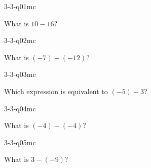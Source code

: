 

\begin{practiceQuestion}{3-3-q01}{mc}
\begin{questionText}
What is $10 - 16$?
\end{questionText}
\end{practiceQuestion}

\begin{practiceQuestion}{3-3-q02}{mc}
\begin{questionText}
What is $(-7) - (-12)$?
\end{questionText}
\end{practiceQuestion}

\begin{practiceQuestion}{3-3-q03}{mc}
\begin{questionText}
Which expression is equivalent to $(-5) - 3$?
\end{questionText}
\end{practiceQuestion}

\begin{practiceQuestion}{3-3-q04}{mc}
\begin{questionText}
What is $(-4) - (-4)$?
\end{questionText}
\end{practiceQuestion}

\begin{practiceQuestion}{3-3-q05}{mc}
\begin{questionText}
What is $3 - (-9)$?
\end{questionText}
\end{practiceQuestion}


